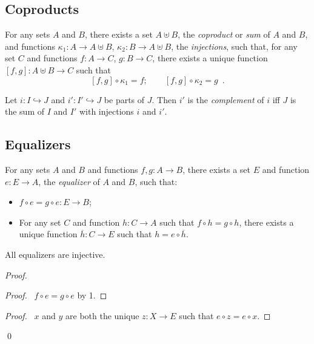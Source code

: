 \subsection{Coproducts}

\begin{ax}[Coproducts]
  For any sets $A$ and $B$, there exists a set $A \uplus B$, the
  \emph{coproduct} or \emph{sum} of $A$ and $B$, and functions $\kappa_1 : A
\rightarrow A
  \uplus B$, $\kappa_2 : B \rightarrow A \uplus B$, the \emph{injections},
  such that, for any set $C$ and functions $f : A \rightarrow C$, $g : B
  \rightarrow C$, there exists a unique function $[f, g] : A \uplus B
  \rightarrow
  C$ such that
  \[ [f,g] \circ \kappa_1 = f; \qquad [f,g] \circ \kappa_2 = g \enspace . \]
\end{ax}

  \begin{df}[Complement]
 Let $i : I \hookrightarrow J$ and $i' : I' \hookrightarrow J$ be parts of
 $J$. Then $i'$ is the \emph{complement} of $i$ iff $J$ is the sum of $I$ and
 $I'$ with injections $i$ and $i'$.
\end{df}


\subsection{Equalizers}

\begin{ax}[Equalizers]
  For any sets $A$ and $B$ and functions $f, g : A \rightarrow B$, there
  exists a set $E$ and function $e : E \rightarrow A$, the \emph{equalizer}
  of
  $A$ and $B$, such that:
  \begin{itemize}
    \item $f \circ e = g \circ e : E \rightarrow B$;
    \item For any set $C$ and function $h : C \rightarrow A$ such that $f
    \circ h
    = g \circ h$, there exists a unique function $\overline{h} : C
    \rightarrow
    E$
    such that $h = e \circ \overline{h}$.
  \end{itemize}
\end{ax}

\begin{prop}
  \label{prop:set_theory:equalizer:injective}
 All equalizers are injective.
\end{prop}

\begin{proof}
 \pf
 \begin{proof}
   \pf\ $f \circ e = g \circ e$ by 1.
 \end{proof}
 \begin{proof}
   \pf\ $x$ and $y$ are both the unique $z : X \rightarrow E$ such that $e
   \circ z = e \circ x$.
 \end{proof}
 \qed
\end{proof}

